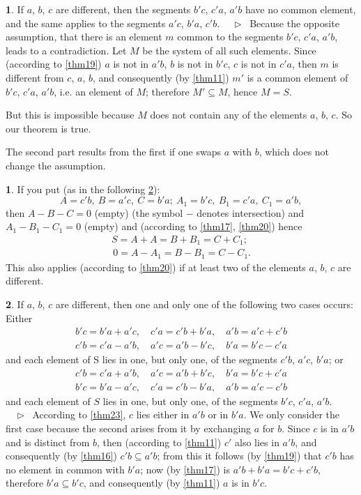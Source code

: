 \documentclass[leqno,hidelinks]{article}
\theoremstyle{definition}
\newtheorem{satz}{\protect\satzname}
\newtheorem*{zusatz}{\protect\zusatzname}
\newcommand{\satzname}{}
\newcommand{\zusatzname}{}
\renewcommand{\satzname}{\hspace{-4pt}.\ Satz}%
\renewcommand{\zusatzname}{Zusatz}%
\renewcommand{\satzname}{\hspace{-4pt}.\ Theorem}%
\renewcommand{\zusatzname}{Corollary}%
\newcommand\Beweis{\medskip \newline $ \phantom{'.'} \rhd \ $}%
\newcommand{\partof}{\subseteq}
\newcommand{\sref}[1]{\underline{\ref{#1}}}%
\begin{document}
\begin{paracol}{2}
\begin{satz}\label{thm24}
If $a$, $b$, $c$ are different, then the segments $b'c$, $c'a$, $a'b$ have no
common element, and the same applies to the segments $a'c$, $b'a$, $c'b$.
\Beweis
Because the opposite assumption, that there is an element $m$ common to the segments
$b'c$, $c'a$, $a'b$, leads to a contradiction. Let $M$ be the system of all such
elements. Since (according to \sref{thm19}) $a$ is not in $a'b$, $b$ is not in $b'c$,
$c$ is not in $c'a$, then $m$ is different from $c$, $a$, $b$, and consequently
(by \sref{thm11}) $m'$ is a common element of $b'c$, $c'a$, $a'b$, i.e. an element
of $M$; therefore $M' \partof M$, hence  $M=S$.

But this is impossible because $M$ does not contain any of the elements $a$, $b$,
$c$. So our theorem is true.

The second part results from the first if one swaps $a$ with $b$, which does not
change the assumption.
\end{satz}

\begin{zusatz}\label{corollary1}
If you put (as in the following \sref{thm25}):
\[
    A = c'b,\ B = a'c,\ C = b'a;\  A_1 = b'c,\ B_1 = c'a,\ C_1 = a'b,
\]
then $A - B - C = 0$ (empty) (the symbol $-$ denotes intersection) and
$A_1 - B_1 - C_1 = 0$ (empty) and (according to \sref{thm17}, \sref{thm20}) hence
\begin{gather*}
    S = A + A = B + B_1 = C + C_1; \\
    \,0 = A - A_1 = B - B_1 = C - C_1.
\end{gather*}
This also applies (according to \sref{thm20}) if at least two of the elements
$a$, $b$, $c$ are different.
\end{zusatz}

\begin{satz}\label{thm25}
If $a$, $b$, $c$ are different, then one and only one of the following two
cases occurs: Either
\begin{gather*}
    b'c = b'a + a'c, \quad c'a = c'b + b'a, \quad a'b = a'c + c'b \\
    c'b = c'a - a'b, \quad a'c = a'b - b'c, \quad b'a = b'c - c'a
\end{gather*}
and each element of S lies in one, but only one, of the segments
$c'b$, $a'c$, $b'a$; or
\begin{gather*}
    c'b = c'a + a'b, \quad a'c = a'b + b'c, \quad b'a = b'c + c'a \\
    b'c = b'a - a'c, \quad c'a = c'b - b'a, \quad a'b = a'c - c'b
\end{gather*}
and each element of $S$ lies in one, but only one, of the segments
$b'c$, $c'a$, $a'b$.
\Beweis
According to \sref{thm23}, $c$ lies either in $a'b$ or in $b'a$. We
only consider the first case because the second arises from it by
exchanging $a$ for $b$.
Since $c$ is in $a'b$ and is distinct from $b$, then
(according to \sref{thm11}) $c'$ also lies in $a'b$, and consequently
(by \sref{thm16}) $c'b \partof a'b$; from this it follows (by \sref{thm19})
that $c'b$ has no element in common with $b'a$; now (by \sref{thm17}) is
$a'b+b'a=b'c+c'b$, therefore $b'a \partof b'c$, and consequently
(by \sref{thm11}) $a$ is in $b'c$.


\end{satz}
\end{paracol}
\end{document}
